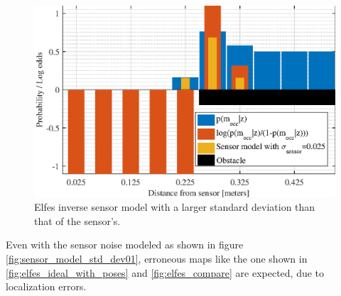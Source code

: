 \begin{figure}[htbp]
	\centering
	\includegraphics[scale=1.0]{figures/static_mapping/sensor_model_std_dev025}
	\caption{Elfes inverse sensor model with a larger standard deviation than that of the sensor's.}
	\label{fig:sensor_model_std_dev025}
\end{figure}

Even with the sensor noise modeled as shown in figure \vref{fig:sensor_model_std_dev01}, erroneous maps like the one shown in \vref{fig:elfes_ideal_with_poses} and \vref{fig:elfes_compare} are expected, due to localization errors.

